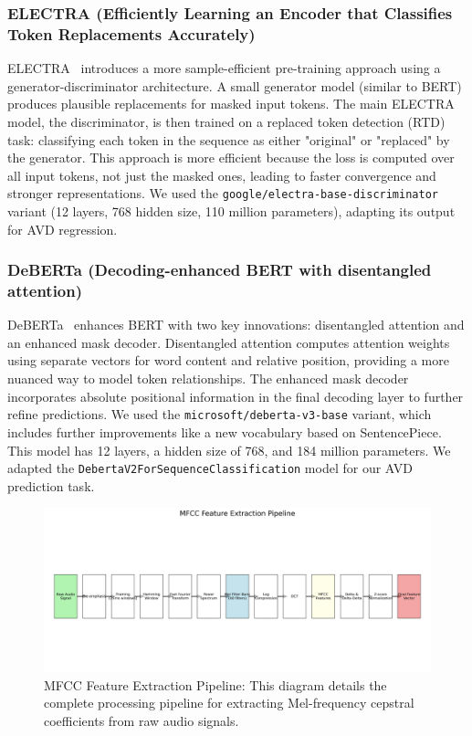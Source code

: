 \documentclass[12pt]{article}
\begin{document}
\subsubsection{ELECTRA (Efficiently Learning an Encoder that Classifies Token Replacements Accurately)}
ELECTRA~\cite{clark2020electra} introduces a more sample-efficient pre-training approach using a generator-discriminator architecture. A small generator model (similar to BERT) produces plausible replacements for masked input tokens. The main ELECTRA model, the discriminator, is then trained on a replaced token detection (RTD) task: classifying each token in the sequence as either "original" or "replaced" by the generator. This approach is more efficient because the loss is computed over all input tokens, not just the masked ones, leading to faster convergence and stronger representations. We used the \texttt{google/electra-base-discriminator} variant (12 layers, 768 hidden size, 110 million parameters), adapting its output for AVD regression.

\subsubsection{DeBERTa (Decoding-enhanced BERT with disentangled attention)}
DeBERTa~\cite{he2020deberta} enhances BERT with two key innovations: disentangled attention and an enhanced mask decoder. Disentangled attention computes attention weights using separate vectors for word content and relative position, providing a more nuanced way to model token relationships. The enhanced mask decoder incorporates absolute positional information in the final decoding layer to further refine predictions. We used the \texttt{microsoft/deberta-v3-base} variant, which includes further improvements like a new vocabulary based on SentencePiece. This model has 12 layers, a hidden size of 768, and 184 million parameters. We adapted the \texttt{DebertaV2ForSequenceClassification} model for our AVD prediction task.

\begin{figure}[h]
    \centering
    \includegraphics[width=1.0\linewidth]{Figures/mfcc_pipeline.png}
    \caption{MFCC Feature Extraction Pipeline: This diagram details the complete processing pipeline for extracting Mel-frequency cepstral coefficients from raw audio signals.}
    \label{fig:mfcc_pipeline}
\end{figure}
\end{document}
